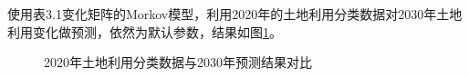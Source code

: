 \documentclass[10pt,aspectratio=169]{beamer} %
\begin{document}
		\begin{frame}[c]{\secname}{\subsecname}
		使用表3.1变化矩阵的Morkov模型，利用2020年的土地利用分类数据对2030年土地利用变化做预测，依然为默认参数，结果如图\ref{Fig.3}。
		\begin{figure}[htbp]
			\centering
			\caption{2020年土地利用分类数据与2030年预测结果对比}
			\label{Fig.3}
		\end{figure}
	
	\end{frame}
\end{document}
